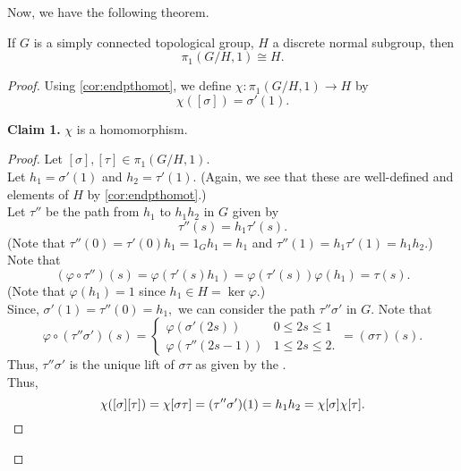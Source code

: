 \documentclass[12pt]{article}
\newenvironment{blockquote}
{\begin{mdframed}[skipabove=0pt, skipbelow=0pt, innertopmargin=4pt, innerbottommargin=4pt, bottomline=false,topline=false,rightline=false, linewidth=2pt]}
{\end{mdframed}}
\begin{document}
Now, we have the following theorem.
\begin{thm}
	If $G$ is a simply connected topological group, $H$ a discrete normal subgroup, then
	\begin{equation*} 
		\pi_1(G/H, 1) \cong H.
	\end{equation*}
\end{thm}
\begin{proof} 
	Using \cref{cor:endpthomot}, we define $\chi:\pi_1(G/H, 1) \to H$ by
	\begin{equation*} 
		\chi([\sigma]) = \sigma'(1).
	\end{equation*}
	\begin{blockquote}
		\textbf{Claim 1.} $\chi$ is a homomorphism.
		\begin{proof} 
			Let $[\sigma], [\tau] \in \pi_1(G/H, 1).$\\
			Let $h_1 = \sigma'(1)$ and $h_2 = \tau'(1).$ (Again, we see that these are well-defined and elements of $H$ by \cref{cor:endpthomot}.) \\
			Let $\tau''$ be the path from $h_1$ to $h_1h_2$ in $G$ given by
			\begin{equation*} 
				\tau''(s) = h_1\tau'(s).
			\end{equation*}
			(Note that $\tau''(0) = \tau'(0)h_1 = 1_Gh_1 = h_1$ and $\tau''(1) = h_1\tau'(1) = h_1h_2.$)\\
			Note that
			\begin{equation*} 
				(\varphi\circ\tau'')(s) = \varphi(\tau'(s)h_1) = \varphi(\tau'(s))\varphi(h_1) = \tau(s).
			\end{equation*}
			(Note that $\varphi(h_1) = 1$ since $h_1 \in H = \ker\varphi.$)\\
			Since, $\sigma'(1) = \tau''(0) = h_1,$ we can consider the path $\tau''\sigma'$ in $G.$ Note that
			\begin{equation*} 
				\varphi\circ(\tau''\sigma')(s) = \begin{cases}
					\varphi(\sigma'(2s)) & 0 \le 2s \le 1\\
					\varphi(\tau''(2s - 1)) & 1 \le 2s \le 2.
				\end{cases} = (\sigma\tau)(s).
			\end{equation*}
			Thus, $\tau''\sigma'$ is the unique lift of $\sigma\tau$ as given by the . \\
			Thus,
			\begin{equation*} 
				\chi([\sigma][\tau]) = \chi[\sigma\tau] = (\tau''\sigma')(1) = h_1h_2 = \chi[\sigma]\chi[\tau]. \qedhere
			\end{equation*}


\end{proof}
\end{blockquote}
\end{proof}
\end{document}
